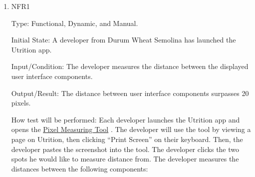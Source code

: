 \documentclass[12pt, titlepage]{article}
\begin{document}
\begin{enumerate}
\item{NFR1\\} 

Type: Functional, Dynamic, and Manual.

Initial State: A developer from Durum Wheat Semolina has launched the Utrition app.

Input/Condition: The developer measures the distance between the displayed user interface components.

Output/Result: The distance between user interface components surpasses 20 pixels.

How test will be performed: Each developer launches the Utrition app and opens the \href{https://www.rapidtables.com/web/tools/pixel-ruler.html}{Pixel Measuring Tool} . The developer will use the tool by viewing a page on Utrition, then clicking “Print Screen'' on their keyboard. Then, the developer pastes the screenshot into the tool. The developer clicks the two spots he would like to measure distance from. The developer measures the distances between the following components:	


\end{enumerate}
\end{document}
